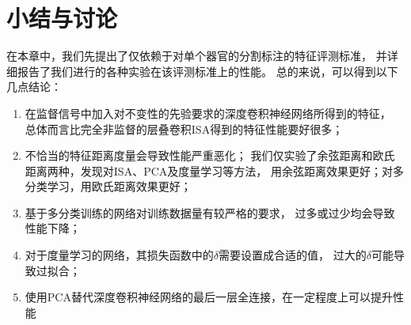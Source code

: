 \section{小结与讨论\label{sec:expr:discuss}}
在本章中，我们先提出了仅依赖于对单个器官的分割标注的特征评测标准，
并详细报告了我们进行的各种实验在该评测标准上的性能。
总的来说，可以得到以下几点结论：
\begin{enumerate}
    \item 在监督信号中加入对不变性的先验要求的深度卷积神经网络所得到的特征，
        总体而言比完全非监督的层叠卷积ISA得到的特征性能要好很多；
    \item 不恰当的特征距离度量会导致性能严重恶化；
        我们仅实验了余弦距离和欧氏距离两种，发现对ISA、PCA及度量学习等方法，
        用余弦距离效果更好；对多分类学习，用欧氏距离效果更好；
    \item 基于多分类训练的网络对训练数据量有较严格的要求，
        过多或过少均会导致性能下降；
    \item 对于度量学习的网络，其损失函数中的$\delta$需要设置成合适的值，
        过大的$\delta$可能导致过拟合；
    \item 使用PCA替代深度卷积神经网络的最后一层全连接，在一定程度上可以提升性能
\end{enumerate}



